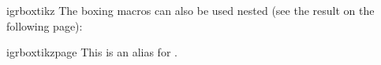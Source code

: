 \documentclass[a4paper,11pt]{ltxdoc}
\begin{document}
\begin{docCommand}{igrboxtikz}{}
The boxing macros can also be used nested (see the result on the following page):
\begin{dispListing}
\end{dispListing}
\tcbusetemp
\end{docCommand}


\begin{docCommand}{igrboxtikzpage}{}
  This is an alias for .
\end{docCommand}
\end{document}
